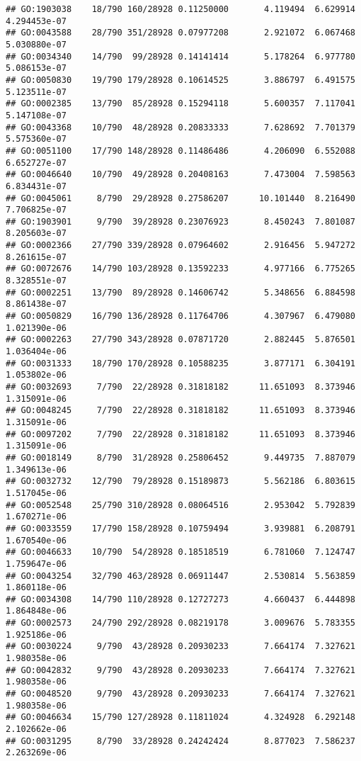 \documentclass[
]{article}
\begin{document}
\begin{verbatim}
## GO:1903038    18/790 160/28928 0.11250000       4.119494  6.629914 4.294453e-07
## GO:0043588    28/790 351/28928 0.07977208       2.921072  6.067468 5.030880e-07
## GO:0034340    14/790  99/28928 0.14141414       5.178264  6.977780 5.086153e-07
## GO:0050830    19/790 179/28928 0.10614525       3.886797  6.491575 5.123511e-07
## GO:0002385    13/790  85/28928 0.15294118       5.600357  7.117041 5.147108e-07
## GO:0043368    10/790  48/28928 0.20833333       7.628692  7.701379 5.575360e-07
## GO:0051100    17/790 148/28928 0.11486486       4.206090  6.552088 6.652727e-07
## GO:0046640    10/790  49/28928 0.20408163       7.473004  7.598563 6.834431e-07
## GO:0045061     8/790  29/28928 0.27586207      10.101440  8.216490 7.706825e-07
## GO:1903901     9/790  39/28928 0.23076923       8.450243  7.801087 8.205603e-07
## GO:0002366    27/790 339/28928 0.07964602       2.916456  5.947272 8.261615e-07
## GO:0072676    14/790 103/28928 0.13592233       4.977166  6.775265 8.328551e-07
## GO:0002251    13/790  89/28928 0.14606742       5.348656  6.884598 8.861438e-07
## GO:0050829    16/790 136/28928 0.11764706       4.307967  6.479080 1.021390e-06
## GO:0002263    27/790 343/28928 0.07871720       2.882445  5.876501 1.036404e-06
## GO:0031333    18/790 170/28928 0.10588235       3.877171  6.304191 1.053802e-06
## GO:0032693     7/790  22/28928 0.31818182      11.651093  8.373946 1.315091e-06
## GO:0048245     7/790  22/28928 0.31818182      11.651093  8.373946 1.315091e-06
## GO:0097202     7/790  22/28928 0.31818182      11.651093  8.373946 1.315091e-06
## GO:0018149     8/790  31/28928 0.25806452       9.449735  7.887079 1.349613e-06
## GO:0032732    12/790  79/28928 0.15189873       5.562186  6.803615 1.517045e-06
## GO:0052548    25/790 310/28928 0.08064516       2.953042  5.792839 1.670271e-06
## GO:0033559    17/790 158/28928 0.10759494       3.939881  6.208791 1.670540e-06
## GO:0046633    10/790  54/28928 0.18518519       6.781060  7.124747 1.759647e-06
## GO:0043254    32/790 463/28928 0.06911447       2.530814  5.563859 1.860118e-06
## GO:0034308    14/790 110/28928 0.12727273       4.660437  6.444898 1.864848e-06
## GO:0002573    24/790 292/28928 0.08219178       3.009676  5.783355 1.925186e-06
## GO:0030224     9/790  43/28928 0.20930233       7.664174  7.327621 1.980358e-06
## GO:0042832     9/790  43/28928 0.20930233       7.664174  7.327621 1.980358e-06
## GO:0048520     9/790  43/28928 0.20930233       7.664174  7.327621 1.980358e-06
## GO:0046634    15/790 127/28928 0.11811024       4.324928  6.292148 2.102662e-06
## GO:0031295     8/790  33/28928 0.24242424       8.877023  7.586237 2.263269e-06

\end{verbatim}
\end{document}
